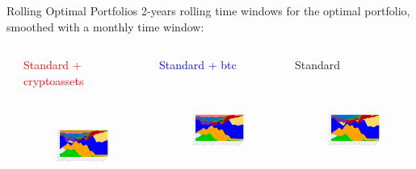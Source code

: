 \documentclass[aspectratio=169]{beamer}
\newcommand\Fontvi{\fontsize{8}{7.2}\selectfont}
\begin{document}
\begin{frame}{Rolling Optimal Portfolios}
2-years rolling time windows for the optimal portfolio, smoothed with a monthly time window:
	\begin{columns}
		\begin{column}{0.1\textwidth}

		\end{column}
		\begin{column}{0.3\textwidth}  
		    \begin{center}
            \Fontvi{}\textcolor{red}{Standard + cryptoassets}
            \end{center}
            \begin{figure}
                \centering
                \includegraphics[width=4cm, height=3cm]{Images/rolling_allocation/rollall.png}
            \end{figure}
		\end{column}
		\begin{column}{0.3\textwidth}  
		    \begin{center}
            \Fontvi{}\textcolor{blue}{Standard + btc}
            \end{center}
            \begin{figure}
                \centering
                \includegraphics[width=4cm, height=3cm]{Images/rolling_allocation/rollbtc.png}
            \end{figure}
		\end{column}
    	\begin{column}{0.3\textwidth} 
    	    \begin{center}
            \Fontvi{}Standard
            \end{center}
            \begin{figure}
                \centering
                \includegraphics[width=4cm, height=3cm]{Images/rolling_allocation/rollno.png}

\end{figure}
\end{column}
\end{columns}
\end{frame}
\end{document}
